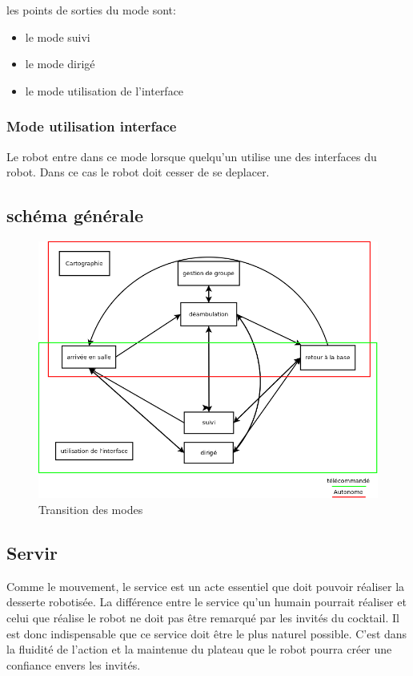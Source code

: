 les points de sorties du mode sont:
\begin{itemize}
\item le mode suivi
\item le mode dirigé
\item le mode utilisation de l'interface\\
\end{itemize}

\subsubsection{Mode utilisation interface}
Le robot entre dans ce mode lorsque quelqu'un utilise une des
interfaces du robot. Dans ce cas le robot doit cesser de se deplacer.

\subsection{schéma générale}

\begin{figure}[h]
\begin{center}
\includegraphics[scale=0.4]{Images/transition_mode.png}
\caption{Transition des modes}
\label{Transition des modes}
\end{center}
\end{figure}

\subsection{Servir}

Comme le mouvement, le service est un acte essentiel que doit pouvoir
réaliser la desserte robotisée.  La différence entre le service qu’un
humain pourrait réaliser et celui que réalise le robot ne doit pas
être remarqué par les invités du cocktail. Il est donc indispensable
que ce service doit être le plus naturel possible. C’est dans la
fluidité de l’action et la maintenue du plateau que le robot pourra
créer une confiance envers les invités.

